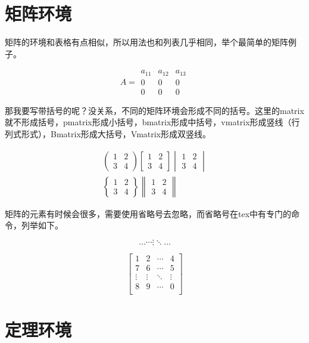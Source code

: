 \section{矩阵环境}
矩阵的环境和表格有点相似，所以用法也和列表几乎相同，举个最简单的矩阵例子。
\begin{codeshow}
\[
A=\begin{matrix}
a_{11} & a_{12} & a_{13}\\
0 & 0 & 0\\
0 & 0 & 0
\end{matrix}
\]
\end{codeshow}

那我要写带括号的呢？没关系，不同的矩阵环境会形成不同的括号。这里的matrix就不形成括号，pmatrix形成小括号，bmatrix形成中括号，vmatrix形成竖线（行列式形式），Bmatrix形成大括号，Vmatrix形成双竖线。
\begin{codeshow}
\begin{gather*}
    \begin{pmatrix}1 & 2\\
    3 & 4\end{pmatrix}
    \begin{bmatrix}1 & 2\\
    3 & 4\end{bmatrix}
    \begin{vmatrix}1 & 2\\
    3 & 4\end{vmatrix}\\
    \begin{Bmatrix}1 & 2\\
    3 & 4\end{Bmatrix}
    \begin{Vmatrix}1 & 2\\
    3 & 4\end{Vmatrix}
\end{gather*}
\end{codeshow}

矩阵的元素有时候会很多，需要使用省略号去忽略，而省略号在tex中有专门的命令，列举如下。
\begin{codeshow}
\[
\ldots \cdots \vdots \ddots \dotsc
\]
\end{codeshow}

\begin{codeshow}
\[\begin{bmatrix}
 1      & 2      & \cdots & 4      \\
 7      & 6      & \cdots & 5      \\
 \vdots & \vdots & \ddots & \vdots \\
 8      & 9      & \cdots & 0      \\
\end{bmatrix}\]
\end{codeshow}


\section{定理环境}